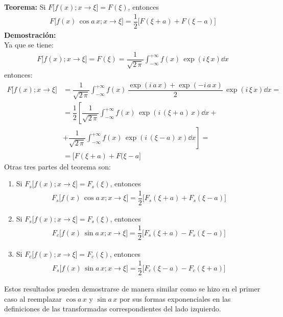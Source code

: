 \textbf{Teorema:} Si $F \big[f(x); x \to \xi \big] = F(\xi)$, entonces
\begin{align*}
F \big[f(x) \, \cos a \, x; x \to \xi \big] = \dfrac{1}{2} \big[F(\xi + a) + F(\xi - a) \big]
\end{align*}
\textbf{Demostración:}
\\
Ya que se tiene:
\begin{align*}
F \big[f(x); x \to \xi \big] = F(\xi) = \dfrac{1}{\sqrt{2 \, \pi}} \int_{-\infty}^{+\infty} f(x) \, \exp(i \, \xi \, x) \dd{x}
\end{align*}
entonces:
\begin{align*}
F \big[f(x); x \to \xi \big] &= \dfrac{1}{\sqrt{2 \, \pi}} \int_{-\infty}^{+\infty} f(x) \, \dfrac{\exp(i \, a \, x) + \exp(-i \, a \, x)}{2} \, \exp(i \, \xi \, x) \dd{x} = \\[0.5em]
&= \dfrac{1}{2} \left[ \dfrac{1}{\sqrt{2 \, \pi}} \int_{-\infty}^{+\infty} f(x) \, \exp(i \, (\xi + a) \, x)  \dd{x} + \right. \\[0.5em]
&+ \left. \dfrac{1}{\sqrt{2 \, \pi}} \int_{-\infty}^{+\infty} f(x) \, \exp(i \, (\xi - a) \, x)  \dd{x} \right] = \\[0.5em]
&= \big[ F(\xi + a) + F (\xi - a \big]
\end{align*}
Otras tres partes del teorema son:
\begin{enumerate}[label=\alph*)]
\item Si $F_{s} \big[f(x); x \to \xi \big] = F_{s} (\xi)$, entonces
\begin{align*}
F_{s} \big[f(x) \, \cos a \, x; x \to \xi \big] = \dfrac{1}{2} \big[F_{s} (\xi +  a) + F_{s} (\xi - a) \big]
\end{align*}
\item Si $F_{s} \big[f(x); x \to \xi \big] = F_{s} (\xi)$, entonces
\begin{align*}
F_{c} \big[f(x) \, \sin a \, x; x \to \xi \big] = \dfrac{1}{2} \big[F_{s} (\xi +  a) - F_{s} (\xi - a) \big]
\end{align*}
\item Si $F_{c} \big[f(x); x \to \xi \big] = F_{c} (\xi)$, entonces
\begin{align*}
F_{s} \big[f(x) \, \sin a \, x; x \to \xi \big] = \dfrac{1}{2} \big[F_{c} (\xi -  a) - F_{c} (\xi + a) \big]
\end{align*}
\end{enumerate}
Estos resultados pueden demostrarse de manera similar como se hizo en el primer caso al reemplazar $\cos a \, x$ y $\sin a \, x$ por sus formas exponenciales en las definiciones de las transformadas correspondientes del lado izquierdo.

